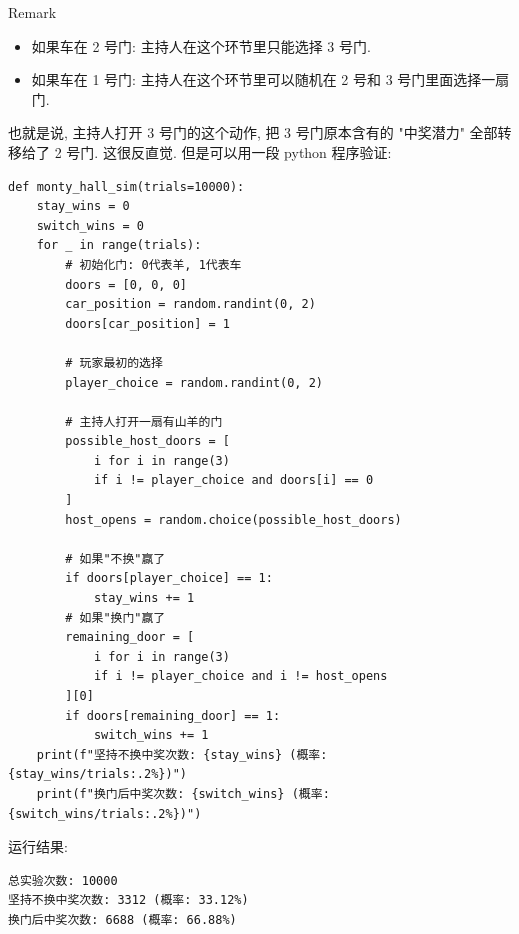 \begin{example}
\begin{qlremark}{Remark}
\begin{itemize}
\item
  如果车在 2 号门: 主持人在这个环节里只能选择 3 号门.
\item
  如果车在 1 号门: 主持人在这个环节里可以随机在 2 号和 3 号门里面选择一扇门.
\end{itemize}

也就是说, 主持人打开 3 号门的这个动作, 把 3 号门原本含有的 "中奖潜力" 全部转移给了 2 号门. 这很反直觉. 但是可以用一段 python 程序验证:

\begin{verbatim}
def monty_hall_sim(trials=10000):
    stay_wins = 0
    switch_wins = 0
    for _ in range(trials):
        # 初始化门: 0代表羊, 1代表车
        doors = [0, 0, 0]
        car_position = random.randint(0, 2)
        doors[car_position] = 1

        # 玩家最初的选择
        player_choice = random.randint(0, 2)

        # 主持人打开一扇有山羊的门
        possible_host_doors = [
            i for i in range(3)
            if i != player_choice and doors[i] == 0
        ]
        host_opens = random.choice(possible_host_doors)

        # 如果"不换"赢了
        if doors[player_choice] == 1:
            stay_wins += 1
        # 如果"换门"赢了
        remaining_door = [
            i for i in range(3)
            if i != player_choice and i != host_opens
        ][0]
        if doors[remaining_door] == 1:
            switch_wins += 1
    print(f"坚持不换中奖次数: {stay_wins} (概率: {stay_wins/trials:.2%})")
    print(f"换门后中奖次数: {switch_wins} (概率: {switch_wins/trials:.2%})")
\end{verbatim}

运行结果:

\begin{verbatim}
总实验次数: 10000
坚持不换中奖次数: 3312 (概率: 33.12%)
换门后中奖次数: 6688 (概率: 66.88%)
\end{verbatim}

\end{qlremark}

\end{example}

